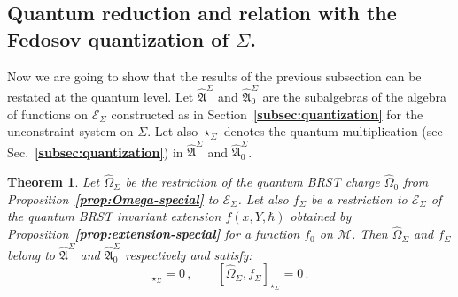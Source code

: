 \documentclass[a4paper,11pt]{amsart}
\newtheorem{thm}{Theorem}
\numberwithin{thm}{section} %
\numberwithin{equation}{section} %
\numberwithin{figure}{section} %
\newcommand{\bref}[1]{{\bf \ref{#1}}}
\newcommand{\commut}[2]{[#1,#2]}
\renewcommand{\:}{{\rm\, :\,}}
\def\manM{{\mathcal M}}
\def\qA{{\hat{\mathfrak A}}}
\def\E{{ \mathcal E}}
\begin{document}
\subsection{Quantum reduction and relation with the Fedosov
quantization of $\Sigma$.}  Now we are going to show that
the results of the previous subsection can be restated at the quantum
level.  Let $\qA^\Sigma$ and $\qA^\Sigma_0$ are
the subalgebras of the algebra of functions on $\E_\Sigma$
constructed as in Section~\bref{subsec:quantization} for the unconstraint system
on $\Sigma$.  Let also $\star_\Sigma$ denotes the
quantum multiplication (see Sec.~\bref{subsec:quantization}) in
$\qA^\Sigma$ and $\qA^\Sigma_0$.
\begin{thm}
Let ${\hat\Omega}_\Sigma$ be the restriction of the
quantum BRST charge ${\hat\Omega}_0$ from
Proposition~\bref{prop:Omega-special} to $\E_\Sigma$. Let also $f_\Sigma$ be
a restriction to $\E_\Sigma$ of the quantum BRST invariant
extension $f(x,Y,\hbar)$ obtained by Proposition~\bref{prop:extension-special}
for a function $f_0$ on $\manM$. Then ${\hat\Omega}_\Sigma$ and
$f_\Sigma$ belong to $\qA^\Sigma$ and $\qA^\Sigma_0$ respectively
and satisfy:
\begin{equation}
  \commut{{\hat\Omega}_\Sigma}{{\hat\Omega}_\Sigma}_{\star_\Sigma}=0\,,
\qquad  
  \commut{{\hat\Omega}_\Sigma}{f_\Sigma}_{\star_\Sigma}=0\,.
\end{equation}
\end{thm}
\end{document}
